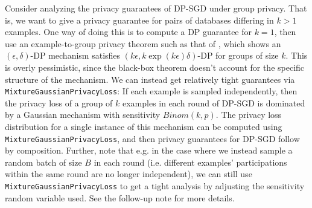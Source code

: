 Consider analyzing the privacy guarantees of DP-SGD under group privacy. That is, we want to give a privacy guarantee for pairs of databases differing in $k > 1$ examples. One way of doing this is to compute a DP guarantee for $k = 1$, then use an example-to-group privacy theorem such as that of \cite{vadhan2017complexity}, which shows an $(\epsilon, \delta)$-DP mechanism satisfies $(k \epsilon, k \exp(k \epsilon) \delta)$-DP for groups of size $k$. This is overly pessimistic, since the black-box theorem doesn't account for the specific structure of the mechanism. We can instead get relatively tight guarantees via  \texttt{MixtureGaussianPrivacyLoss}: If each example is sampled independently, then the privacy loss of a group of $k$ examples in each round of DP-SGD is dominated by a Gaussian mechanism with sensitivity $Binom(k, p)$. The privacy loss distribution for a single instance of this mechanism can be computed using \texttt{MixtureGaussianPrivacyLoss}, and then privacy guarantees for DP-SGD follow by composition. Further, note that e.g. in the case where we instead sample a random batch of size $B$ in each round (i.e. different examples' participations within the same round are no longer independent), we can still use \texttt{MixtureGaussianPrivacyLoss} to get a tight analysis by adjusting the sensitivity random variable used. See the follow-up note \cite{ganesh2024tight} for more details. 